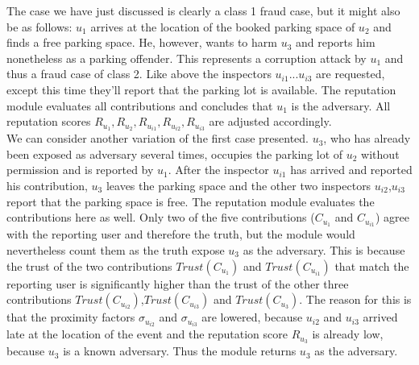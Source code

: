 The case we have just discussed is clearly a class 1 fraud case, but it might also be as follows: $u_1$ arrives at the location of the booked parking space of $u_2$ and finds a free parking space. He, however, wants to harm $u_3$ and reports him nonetheless as a parking offender. This represents a corruption attack by $u_1$ and thus a fraud case of class 2. Like above the inspectors $u_{i1}$...$u_{i3}$ are requested, except this time they'll report that the parking lot is available. The reputation module evaluates all contributions and concludes that $u_1$ is the adversary. All reputation scores $R_{u_1}, R_{u_2}, R_{u_{i1}}, R_{u_{i2}}, R_{u_{i3}}$ are adjusted accordingly.\\

We can consider another variation of the first case presented. $u_3$, who has already been exposed as adversary several times, occupies the parking lot of $u_2$ without permission and is reported by $u_1$. After the inspector $u_{i1}$ has arrived and reported his contribution, $u_3$ leaves the parking space and the other two inspectors $u_{i2}$,$u_{i3}$ report that the parking space is free. The reputation module evaluates the contributions here as well. Only two of the five contributions ($C_{u_{1}}$ and $C_{u_{i1}}$) agree with the reporting user and therefore the truth, but the module would nevertheless count them as the truth expose $u_3$ as the adversary. This is because the trust of the two contributions $Trust(C_{u_{1}})$ and $Trust(C_{u_{i1}})$ that match the reporting user is significantly higher than the trust of the other three contributions $Trust(C_{u_{i2}})$,$Trust(C_{u_{i3}})$ and $Trust(C_{u_{3}})$. The reason for this is that the proximity factors $\sigma_{u_{i2}}$ and $\sigma_{u_{i3}}$ are lowered, because $u_{i2}$ and $u_{i3}$ arrived late at the location of the event and the reputation score $R_{u_3}$ is already low, because $u_3$ is a known adversary. Thus the module returns $u_3$ as the adversary.
